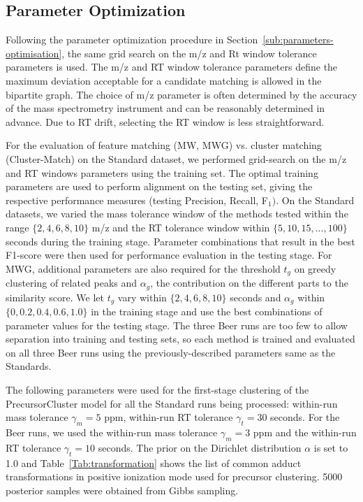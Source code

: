 \subsection{Parameter Optimization\label{sub:parameters}}

Following the parameter optimization procedure in Section~\ref{sub:parameters-optimisation}, the same grid search on the m/z and Rt window tolerance parameters is used.  The m/z and RT window tolerance parameters define the maximum deviation acceptable for a candidate matching is allowed in the bipartite graph. The choice of m/z parameter is often determined by the accuracy of the mass spectrometry instrument and can be reasonably determined in advance. Due to RT drift, selecting the RT window is less straightforward. 

For the evaluation of feature matching (MW, MWG) vs. cluster matching (Cluster-Match) on the Standard dataset, we performed grid-search on the m/z and RT windows parameters using the training set. The optimal training parameters are used to perform alignment on the testing set, giving the respective performance measures (testing Precision, Recall, F$_{1})$. On the Standard datasets, we varied the mass tolerance window of the methods tested within the range $\{2,4,6,8,10\}$ m/z and the RT tolerance window within $\{5,10,15,...,100\}$ seconds during the training stage. Parameter combinations that result in the best F1-score were then used for performance evaluation in the testing stage. For MWG, additional parameters are also required for the threshold $t_{g}$ on greedy clustering of related peaks and $\alpha_{g}$, the contribution on the different parts to the similarity score. We let $t_{g}$ vary within $\{2,4,6,8,10\}$ seconds and $\alpha_{g}$ within $\{0,0.2,0.4,0.6,1.0\}$ in the training stage and use the best combinations of parameter values for the testing stage. The three Beer runs are too few to allow separation into training and testing sets, so each method is trained and evaluated on all three Beer runs using the previously-described parameters same as the Standards.

The following parameters were used for the first-stage clustering of the PrecursorCluster model for all the Standard runs being processed: within-run mass tolerance $\gamma_m=5$ ppm, within-run RT tolerance $\gamma_t=30$ seconds. For the Beer runs, we used the within-run mass tolerance $\gamma_m=3$ ppm and the within-run RT tolerance $\gamma_t=10$ seconds. The prior on the Dirichlet distribution $\alpha$ is set to 1.0 and Table~\ref{Tab:transformation} shows the list of common adduct transformations in positive ionization mode used for precursor clustering. 5000 posterior samples were obtained from Gibbs sampling.


